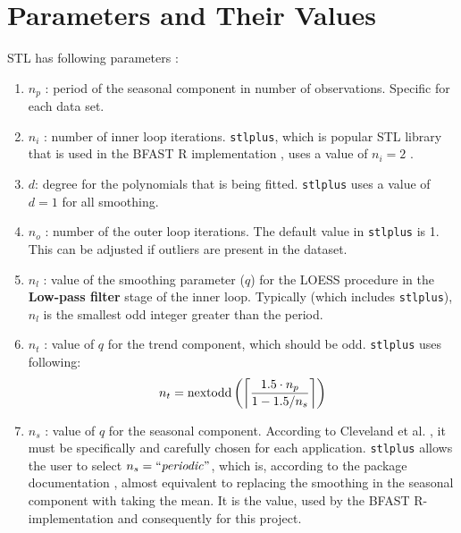 \documentclass[main.tex]{subfiles}
\begin{document}
\section{Parameters and Their Values}
\label{sec:parameter_values}
STL has following parameters \cite{stl}:
\begin{enumerate}
\item $n_p$ : period of the seasonal component in number of observations.
  Specific for each data set.
\item $n_i$ : number of inner loop iterations. \texttt{stlplus}, which is
  popular STL library that is used in the BFAST R implementation \cite{bfast-github}, uses a
  value of $n_i = 2$ \cite{stlplus}.
\item $d$: degree for the polynomials that is being fitted.
  \texttt{stlplus} uses a value of $d=1$ for all smoothing.
\item $n_o$ : number of the outer loop iterations. The default value in
  \texttt{stlplus} is 1. This can be adjusted if outliers are present in the dataset.
\item $n_l$ : value of the smoothing parameter ($q$) for the LOESS procedure in the
  \textbf{Low-pass filter} stage of the inner loop. Typically (which includes
  \texttt{stlplus}), $n_l$ is the smallest odd integer greater than the period.
\item $n_t$ : value of $q$ for the trend component, which should be odd.
  \texttt{stlplus} uses following:
  \[
  n_t =\text{nextodd}\left(
  \ceil[\bigg]{
    \frac{1.5 \cdot n_p}
         {1-1.5/n_s}
  }
  \right)
  \]
\item $n_s$ : value of $q$ for the seasonal component. According to Cleveland
  et al. \cite{stl}, it must be specifically and
  carefully chosen for each application. \texttt{stlplus} allows
  the user to select $n_s = \text{``\emph{periodic}''}$, which is, according to
  the package documentation \cite{stlplus}, almost equivalent to replacing
  the smoothing in the seasonal component with taking the mean. It is the value,
  used by the BFAST R-implementation and consequently for this project.
\end{enumerate}
\biblio
\end{document}
